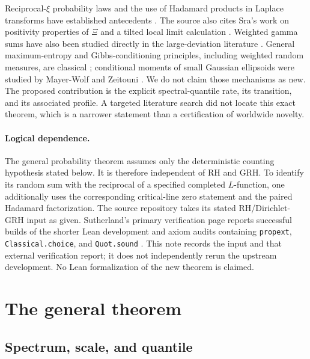 \documentclass[11pt,letterpaper]{article}
\numberwithin{equation}{section}
\theoremstyle{definition}
\theoremstyle{remark}
\begin{document}
Reciprocal-$\xi$ probability laws and the use of Hadamard products in Laplace transforms have established antecedents \cite{RoynetteYor,Gao}. The source also cites Sra's work on positivity properties of $\Xi$ and a tilted local limit calculation \cite{Sra}. Weighted gamma sums have also been studied directly in the large-deviation literature \cite{Saulis}. General maximum-entropy and Gibbs-conditioning principles, including weighted random measures, are classical \cite{VanCampenhoutCover,Gozlan}; conditional moments of small Gaussian ellipsoids were studied by Mayer-Wolf and Zeitouni \cite{MayerWolfZeitouni}. We do not claim those mechanisms as new. The proposed contribution is the explicit spectral-quantile rate, its transition, and its associated profile. A targeted literature search did not locate this exact theorem, which is a narrower statement than a certification of worldwide novelty.

\paragraph{Logical dependence.}
The general probability theorem assumes only the deterministic counting hypothesis stated below. It is therefore independent of RH and GRH. To identify its random sum with the reciprocal of a specified completed $L$-function, one additionally uses the corresponding critical-line zero statement and the paired Hadamard factorization. The source repository takes its stated RH/Dirichlet-GRH input as given. Sutherland's primary verification page reports successful builds of the shorter Lean development and axiom audits containing \texttt{propext}, \texttt{Classical.choice}, and \texttt{Quot.sound} \cite{Sutherland}. This note records the input and that external verification report; it does not independently rerun the upstream development. No Lean formalization of the new theorem is claimed.

\section{The general theorem}\label{sec:general}

\subsection{Spectrum, scale, and quantile}
\end{document}

